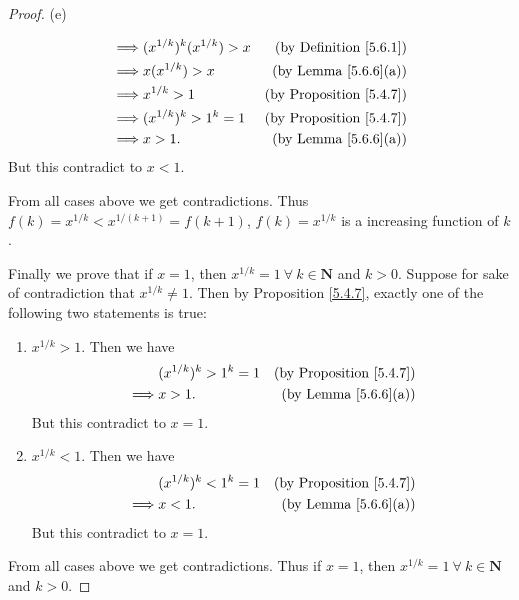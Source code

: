 \begin{proof}{(e)}
\begin{enumerate}[label=(\Roman*)]
\begin{align*}
                  \implies & (x^{1 / k})^k (x^{1 / k}) > x                       & \text{(by Definition \ref{5.6.1})}  \\
                  \implies & x (x^{1 / k}) > x                                   & \text{(by Lemma \ref{5.6.6}(a))}    \\
                  \implies & x^{1 / k} > 1                                       & \text{(by Proposition \ref{5.4.7})} \\
                  \implies & (x^{1 / k})^k > 1^k = 1                             & \text{(by Proposition \ref{5.4.7})} \\
                  \implies & x > 1.                                              & \text{(by Lemma \ref{5.6.6}(a))}
              \end{align*}
              But this contradict to \(x < 1\).
    \end{enumerate}
    From all cases above we get contradictions.
    Thus \(f(k) = x^{1 / k} < x^{1 / (k + 1)} = f(k + 1)\), \(f(k) = x^{1 / k}\) is a increasing function of \(k\).

    Finally we prove that if \(x = 1\), then \(x^{1 / k} = 1 \ \forall\ k \in \mathbf{N}\) and \(k > 0\).
    Suppose for sake of contradiction that \(x^{1 / k} \neq 1\).
    Then by Proposition \ref{5.4.7}, exactly one of the following two statements is true:
    \begin{enumerate}[label=(\Roman*)]
        \item \(x^{1 / k} > 1\).
              Then we have
              \begin{align*}
                           & (x^{1 / k})^k > 1^k = 1 & \text{(by Proposition \ref{5.4.7})} \\
                  \implies & x > 1.                  & \text{(by Lemma \ref{5.6.6}(a))}
              \end{align*}
              But this contradict to \(x = 1\).
        \item \(x^{1 / k} < 1\).
              Then we have
              \begin{align*}
                           & (x^{1 / k})^k < 1^k = 1 & \text{(by Proposition \ref{5.4.7})} \\
                  \implies & x < 1.                  & \text{(by Lemma \ref{5.6.6}(a))}
              \end{align*}
              But this contradict to \(x = 1\).
    \end{enumerate}
    From all cases above we get contradictions.
    Thus if \(x = 1\), then \(x^{1 / k} = 1 \ \forall\ k \in \mathbf{N}\) and \(k > 0\).
\end{proof}


